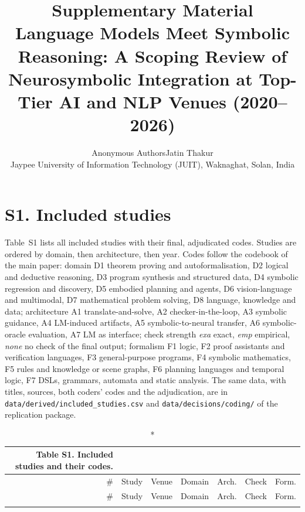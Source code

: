 \documentclass[10pt,a4paper]{article}
\title{Supplementary Material\\[2pt]\large Language Models Meet Symbolic Reasoning: A Scoping Review of Neurosymbolic Integration at Top-Tier AI and NLP Venues (2020--2026)}
\author{\ifanonymous Anonymous Authors\else Jatin Thakur\\Jaypee University of Information Technology (JUIT), Waknaghat, Solan, India\fi}
\date{}
\begin{document}
\maketitle

\section*{S1. Included studies}
Table~S1 lists all  included studies with their final, adjudicated codes. Studies are ordered by domain, then architecture, then year. Codes follow the codebook of the main paper:
domain D1 theorem proving and autoformalisation, D2 logical and deductive reasoning, D3 program synthesis and structured data, D4 symbolic regression and discovery, D5 embodied planning and agents, D6 vision-language and multimodal, D7 mathematical problem solving, D8 language, knowledge and data;
architecture A1 translate-and-solve, A2 checker-in-the-loop, A3 symbolic guidance, A4 LM-induced artifacts, A5 symbolic-to-neural transfer, A6 symbolic-oracle evaluation, A7 LM as interface;
check strength \emph{exa} exact, \emph{emp} empirical, \emph{none} no check of the final output;
formalism F1 logic, F2 proof assistants and verification languages, F3 general-purpose programs, F4 symbolic mathematics, F5 rules and knowledge or scene graphs, F6 planning languages and temporal logic, F7 DSLs, grammars, automata and static analysis.
The same data, with titles, sources, both coders' codes and the adjudication, are in \texttt{data/derived/included\_studies.csv} and \texttt{data/decisions/coding/} of the replication package.

\footnotesize
\setlength{\tabcolsep}{4pt}
\begin{longtable}{@{}r >{\raggedright\arraybackslash}p{9.2cm} l c c c c@{}}
\caption*{\normalsize Table S1. Included studies and their codes.}\\
\toprule
\# & Study & Venue & Domain & Arch. & Check & Form. \\
\midrule
\endfirsthead
\toprule
\# & Study & Venue & Domain & Arch. & Check & Form. \\
\midrule
\endhead
\bottomrule
\endfoot

\end{longtable}
\normalsize



\end{document}
